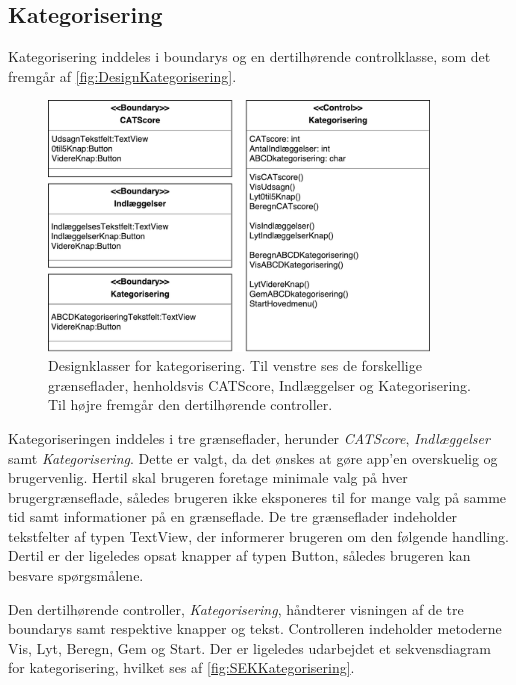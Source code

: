 \subsection*{Kategorisering}
Kategorisering inddeles i boundarys og en dertilhørende controlklasse, som det fremgår af \autoref{fig:DesignKategorisering}.

\begin{figure} [H]
\centering
\includegraphics[width=0.9\textwidth]{figures/MVC/MVCKategorisering}
\caption{Designklasser for kategorisering. Til venstre ses de forskellige grænseflader, henholdsvis CATScore, Indlæggelser og Kategorisering. Til højre fremgår den dertilhørende controller.}
\label{fig:DesignKategorisering}
\end{figure}

\noindent
Kategoriseringen inddeles i tre grænseflader, herunder \textit{CATScore}, \textit{Indlæggelser} samt \textit{Kategorisering}. Dette er valgt, da det ønskes at gøre app’en overskuelig og
brugervenlig. Hertil skal brugeren foretage minimale valg på hver brugergrænseflade, således
brugeren ikke eksponeres til for mange valg på samme tid samt informationer på en grænseflade. De tre grænseflader indeholder tekstfelter af typen TextView, der informerer brugeren om den følgende handling. Dertil er der ligeledes opsat knapper af typen Button, således brugeren kan besvare spørgsmålene. 

Den dertilhørende controller, \textit{Kategorisering}, håndterer visningen af de tre boundarys samt respektive knapper og tekst. Controlleren indeholder metoderne Vis, Lyt, Beregn, Gem og Start. 
Der er ligeledes udarbejdet et sekvensdiagram for kategorisering, hvilket ses af \autoref{fig:SEKKategorisering}.

